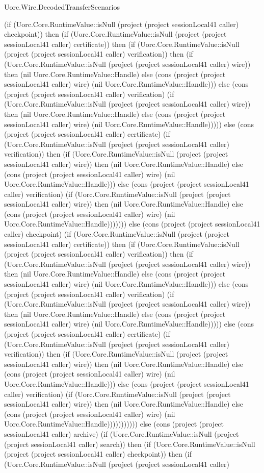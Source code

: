 \begin{lexlean}{Uorc.Wire.DecodedTransferScenarios}
\begin{semanticmodule}
{(if (Uorc.Core.RuntimeValue::isNull (project (project sessionLocal41 caller) checkpoint)) then (if (Uorc.Core.RuntimeValue::isNull (project (project sessionLocal41 caller) certificate)) then (if (Uorc.Core.RuntimeValue::isNull (project (project sessionLocal41 caller) verification)) then (if (Uorc.Core.RuntimeValue::isNull (project (project sessionLocal41 caller) wire)) then (nil Uorc.Core.RuntimeValue::Handle) else (cons (project (project sessionLocal41 caller) wire) (nil Uorc.Core.RuntimeValue::Handle))) else (cons (project (project sessionLocal41 caller) verification) (if (Uorc.Core.RuntimeValue::isNull (project (project sessionLocal41 caller) wire)) then (nil Uorc.Core.RuntimeValue::Handle) else (cons (project (project sessionLocal41 caller) wire) (nil Uorc.Core.RuntimeValue::Handle))))) else (cons (project (project sessionLocal41 caller) certificate) (if (Uorc.Core.RuntimeValue::isNull (project (project sessionLocal41 caller) verification)) then (if (Uorc.Core.RuntimeValue::isNull (project (project sessionLocal41 caller) wire)) then (nil Uorc.Core.RuntimeValue::Handle) else (cons (project (project sessionLocal41 caller) wire) (nil Uorc.Core.RuntimeValue::Handle))) else (cons (project (project sessionLocal41 caller) verification) (if (Uorc.Core.RuntimeValue::isNull (project (project sessionLocal41 caller) wire)) then (nil Uorc.Core.RuntimeValue::Handle) else (cons (project (project sessionLocal41 caller) wire) (nil Uorc.Core.RuntimeValue::Handle))))))) else (cons (project (project sessionLocal41 caller) checkpoint) (if (Uorc.Core.RuntimeValue::isNull (project (project sessionLocal41 caller) certificate)) then (if (Uorc.Core.RuntimeValue::isNull (project (project sessionLocal41 caller) verification)) then (if (Uorc.Core.RuntimeValue::isNull (project (project sessionLocal41 caller) wire)) then (nil Uorc.Core.RuntimeValue::Handle) else (cons (project (project sessionLocal41 caller) wire) (nil Uorc.Core.RuntimeValue::Handle))) else (cons (project (project sessionLocal41 caller) verification) (if (Uorc.Core.RuntimeValue::isNull (project (project sessionLocal41 caller) wire)) then (nil Uorc.Core.RuntimeValue::Handle) else (cons (project (project sessionLocal41 caller) wire) (nil Uorc.Core.RuntimeValue::Handle))))) else (cons (project (project sessionLocal41 caller) certificate) (if (Uorc.Core.RuntimeValue::isNull (project (project sessionLocal41 caller) verification)) then (if (Uorc.Core.RuntimeValue::isNull (project (project sessionLocal41 caller) wire)) then (nil Uorc.Core.RuntimeValue::Handle) else (cons (project (project sessionLocal41 caller) wire) (nil Uorc.Core.RuntimeValue::Handle))) else (cons (project (project sessionLocal41 caller) verification) (if (Uorc.Core.RuntimeValue::isNull (project (project sessionLocal41 caller) wire)) then (nil Uorc.Core.RuntimeValue::Handle) else (cons (project (project sessionLocal41 caller) wire) (nil Uorc.Core.RuntimeValue::Handle))))))))))) else (cons (project (project sessionLocal41 caller) archive) (if (Uorc.Core.RuntimeValue::isNull (project (project sessionLocal41 caller) search)) then (if (Uorc.Core.RuntimeValue::isNull (project (project sessionLocal41 caller) checkpoint)) then (if (Uorc.Core.RuntimeValue::isNull (project (project sessionLocal41 caller) }
\end{semanticmodule}
\end{lexlean}
